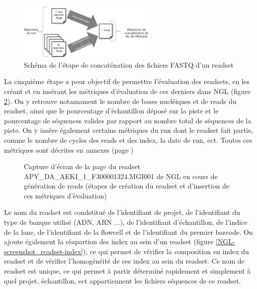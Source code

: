 \begin{figure}[H]
    \centering
    \includegraphics[width=0.6\textwidth]{img/Schéma_concaténation.png}
    \caption{\footnotesize{Schéma de l'étape de \og concaténation\fg{} des fichiers FASTQ d'un readset}}
    \label{schema-concat-fastq}
\end{figure}

La cinquiéme étape a pour objectif de permettre l'évaluation des readsets, en les créant et en insérant les métriques d'évaluation de ces derniers dans NGL (figure \ref{NGL-screenshot_readset}).
On y retrouve notamament le nombre de bases nucléiques et de reads du readset, ainsi que le pourcentage d'échantillon déposé sur la piste et le pourcentage de séquences valides par rapport au nombre total de séquences de la piste.
On y insère également certains métriques du run dont le readset fait partie, comme le nombre de cycles des reads et des index, la date de run, ect. Toutes ces métriques sont décrites en annexes (page \pageref{anexes3})

\begin{figure}[H]
    \centering
    \caption{\footnotesize{Capture d'écran de la page du readset APY\_DA\_AEKI\_1\_F300001324.MGI001 de NGL en cours de génération de reads (étapes de création du readset et d'insertion de ces métriques d'évaluation)}}
    \label{NGL-screenshot_readset}
\end{figure}

Le nom du readset est condstitué de l'identifiant de projet, de l'identifiant du type de banque utilisé (ADN, ARN ...), de l'identifiant d'échantillon, de l'indice de la lane, de l'identifiant de la flowcell et de l'identifiant du premier barcode.
On ajoute également la réapartion des index au sein d'un readset (figure \ref{NGL-screenshot_readset-index}), ce qui permet de vérifier la composition en index du readset et de vérifier l'homogénéité de ces index au sein du readset.
Ce nom de readset est unique, ce qui permet à partir déterminé rapidement et simplement à quel projet, échantillon, ect appartiennent les fichiers séquences de ce readset.

